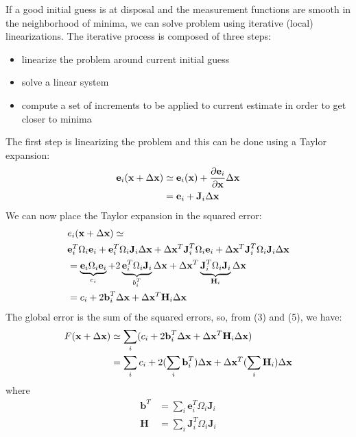 \documentclass[a4paper, onecolumn]{report}
\begin{document}
If a good initial guess is at disposal and the measurement functions are smooth in the neighborhood of minima, we can solve problem using iterative (local) linearizations. The iterative process is composed of three steps:
\begin{itemize}
	\item{linearize the problem around current initial guess}
	\item{solve a linear system}
	\item{compute a set of increments to be applied to current estimate in order to get closer to minima}
\end{itemize}
The first step is linearizing the problem and this can be done using a Taylor expansion:
\begin{align}
	\textbf{e}_i(\textbf{x} + \Delta\textbf{x}) &\simeq \textbf{e}_i(\textbf{x}) + \frac{\partial \textbf{e}_i}{\partial \textbf{x}}\Delta\textbf{x}\\
	&= \textbf{e}_i + \textbf{J}_i\Delta\textbf{x} \notag
\end{align}
We can now place the Taylor expansion in the squared error:
\begin{align}
	&e_i(\textbf{x} + \Delta\textbf{x}) \simeq \notag \\
	&\textbf{e}_i^T\Omega_i\textbf{e}_i + \textbf{e}_i^T\Omega_i\textbf{J}_i\Delta\textbf{x} + \Delta\textbf{x}^T\textbf{J}_i^T\Omega_i\textbf{e}_i + \Delta\textbf{x}^T\textbf{J}^T_i\Omega_i\textbf{J}_i\Delta\textbf{x} \notag \\
	&= \underbrace{\textbf{e}_i\Omega_i\textbf{e}_i}_\text{$c_i$} + 2\underbrace{\textbf{e}_i^T\Omega_i\textbf{J}_i}_\text{$b_i^T$}\Delta\textbf{x} + \Delta\textbf{x}^T\underbrace{\textbf{J}_i^T\Omega_i\textbf{J}_i}_\text{$\textbf{H}_i$}\Delta\textbf{x} \notag \\
	&= c_i + 2\textbf{b}_i^T\Delta\textbf{x} + \Delta\textbf{x}^T\textbf{H}_i\Delta\textbf{x}
\end{align}
The global error is the sum of the squared errors, so, from (3) and (5), we have:
\begin{align}
	F(\textbf{x} + \Delta\textbf{x}) &\simeq \sum_i(c_i + 2\textbf{b}_i^T\Delta\textbf{x} + \Delta\textbf{x}^T\textbf{H}_i\Delta\textbf{x}) \notag \\
	&= \sum_i c_i + 2(\sum_i\textbf{b}_i^T)\Delta\textbf{x} + \Delta\textbf{x}^T(\sum_i\textbf{H}_i)\Delta\textbf{x}
\end{align}
where
\begin{align}
	\textbf{b}^T &= \sum_i\textbf{e}_i^T\Omega_i\textbf{J}_i  \\
	\textbf{H} &= \sum_i\textbf{J}_i^T\Omega_i\textbf{J}_i 
\end{align}
\end{document}
